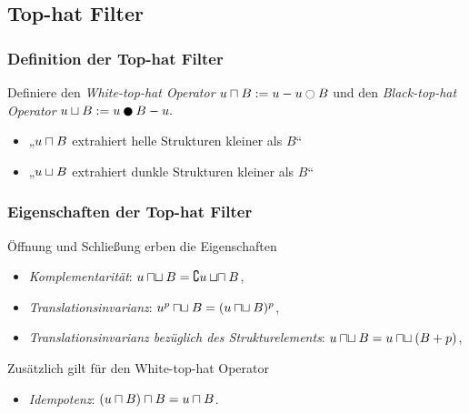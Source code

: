 \documentclass{beamer}
\begin{document}
\subsection{Top-hat Filter}

\begin{frame}
    \frametitle{Definition der Top-hat Filter}
    \begin{definition}
        Definiere den \emph{White-top-hat Operator}
        \begin{math}
            u \wtophat B := u - u \open B
        \end{math}
        und den \emph{Black-top-hat Operator}
        \begin{math}
            u \btophat B := u \close B - u.
        \end{math}
    \end{definition}
    \begin{itemize}
        \item
            „$u \sqcap B$ extrahiert helle Strukturen kleiner als $B$“
        \item
            „$u \sqcup B$ extrahiert dunkle Strukturen kleiner als $B$“
    \end{itemize}
\end{frame}

\begin{frame}
    \frametitle{Eigenschaften der Top-hat Filter}
    \begin{definition}
        Öffnung und Schließung erben die Eigenschaften
        \begin{itemize}
            \item
                \emph{Komplementarität}: $u \mathbin{\sqcap\mkern-1mu\sqcup} B = \complement u \mathbin{\sqcup\mkern-1mu\sqcap} B$,
            \item
                \emph{Translationsinvarianz}: $u^p \mathbin{\sqcap\mkern-1mu\sqcup} B = (u \mathbin{\sqcap\mkern-1mu\sqcup} B)^p$,
            \item
                \emph{Translationsinvarianz bezüglich des Strukturelements}: $u \mathbin{\sqcap\mkern-1mu\sqcup} B = u \mathbin{\sqcap\mkern-1mu\sqcup} (B + p)$,
        \end{itemize}
        Zusätzlich gilt für den White-top-hat Operator
        \begin{itemize}
            \item
                \emph{Idempotenz}: $(u \sqcap B) \sqcap B = u \sqcap B$.
        \end{itemize}
    \end{definition}
\end{frame}
\end{document}
